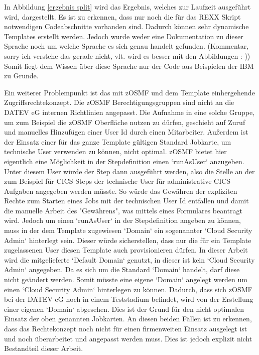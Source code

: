 In Abbildung \ref{ergebnis split} wird das Ergebnis, welches zur Laufzeit ausgeführt wird, dargestellt.
Es ist zu erkennen, dass nur noch die für das REXX Skript notwendigen Codeabschnitte vorhanden sind.
Dadurch können sehr dynamische Templates erstellt werden.
Jedoch wurde weder eine Dokumentation zu dieser Sprache noch um welche Sprache es sich genau handelt gefunden. (Kommentar, sorry ich verstehe das gerade nicht, vlt. wird es besser mit den Abbildungen :-))
Somit liegt dem Wissen über diese Sprache nur der Code aus Beispielen der IBM zu Grunde.

Ein weiterer Problempunkt ist das mit zOSMF und dem Template einhergehende Zugriffsrechtekonzept.
Die zOSMF Berechtigungsgruppen sind nicht an die DATEV eG internen Richtlinien angepasst.
Die Aufnahme in eine solche Gruppe, um zum Beispiel die zOSMF Oberfläche nutzen zu dürfen, geschieht auf Zuruf und manuelles Hinzufügen einer User Id durch einen Mitarbeiter.
Außerdem ist der Einsatz einer für das ganze Template gültigen Standard Jobkarte, um technische User verwenden zu können, nicht optimal.
zOSMF bietet hier eigentlich eine Möglichkeit in der Stepdefinition einen `runAsUser` anzugeben.
Unter diesem User würde der Step dann ausgeführt werden, also die Stelle an der zum Beispiel für CICS Steps der technische User für administrative CICS Aufgaben angegeben werden müsste.
So würde das Gewähren der expliziten Rechte zum Starten eines Jobs mit der technischen User Id entfallen und damit die manuelle Arbeit des "Gewährens", was mittels eines Formulares beantragt wird.
Jedoch um einen `runAsUser` in der Stepdefinition angeben zu können, muss in der dem Template zugewiesen `Domain` ein sogenannter `Cloud Security Admin` hinterlegt sein.
Dieser würde sicherstellen, dass nur die für ein Template zugelassenen User diesen Template auch provisionieren dürfen.
In dieser Arbeit wird die mitgelieferte `Default Domain` genutzt, in dieser ist kein `Cloud Security Admin` angegeben.
Da es sich um die Standard `Domain` handelt, darf diese nicht geändert werden.
Somit müsste eine eigene `Domain` angelegt werden um einen `Cloud Security Admin` hinterlegen zu können.
Dadurch, dass sich zOSMF bei der DATEV eG noch in einem Teststadium befindet, wird von der Erstellung einer eigenen `Domain` abgesehen.
Dies ist der Grund für den nicht optimalen Einsatz der oben genannten Jobkarten.
An diesen beiden Fällen ist zu erkennen, dass das Rechtekonzept noch nicht für einen firmenweiten Einsatz ausgelegt ist und noch überarbeitet und angepasst werden muss.
Dies ist jedoch explizit nicht Bestandteil dieser Arbeit.


 
